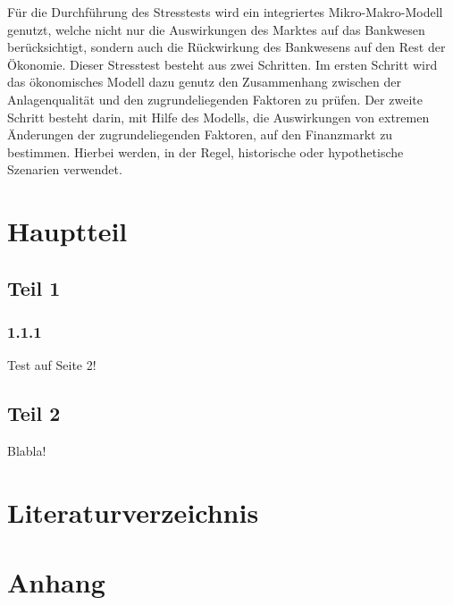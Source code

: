 \documentclass[a4paper,12pt]{scrartcl}
\begin{document}
Für die Durchführung des Stresstests wird ein integriertes Mikro-Makro-Modell genutzt, welche nicht nur die Auswirkungen des Marktes auf das Bankwesen berücksichtigt, sondern auch die Rückwirkung des Bankwesens auf den Rest der Ökonomie. Dieser Stresstest besteht aus zwei Schritten. Im ersten Schritt wird das ökonomisches Modell dazu genutz den Zusammenhang zwischen der Anlagenqualität und den zugrundeliegenden Faktoren zu prüfen. Der zweite Schritt besteht darin, mit Hilfe des Modells, die Auswirkungen von extremen Änderungen der zugrundeliegenden Faktoren, auf den Finanzmarkt zu bestimmen. Hierbei werden, in der Regel, historische oder hypothetische Szenarien verwendet.
\newpage

\section{Hauptteil}
\subsection{Teil 1}
\subsubsection{1.1.1}

Test auf Seite 2!
\newpage
\subsection{Teil 2}

Blabla!
\newpage

\section{Literaturverzeichnis}
\newpage

\section{Anhang}
\end{document}
